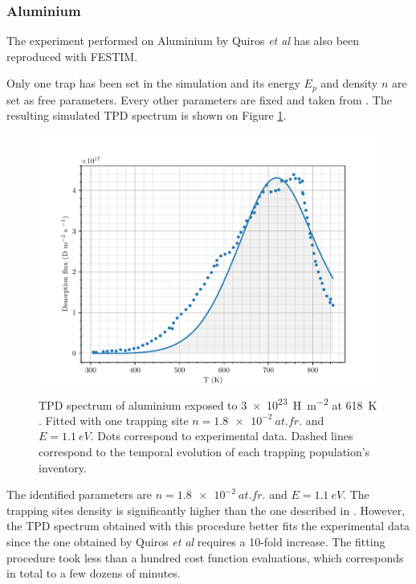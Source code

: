 \subsubsection{Aluminium}

The experiment performed on Aluminium by Quiros \textit{et al}  has also been reproduced with FESTIM.

Only one trap has been set in the simulation and its energy $E_p$ and density $n$ are set as free parameters.
Every other parameters are fixed and taken from \cite{quiros_blister_2017, quiros_blistering_2019}.
The resulting simulated TPD spectrum is shown on Figure \ref{fig:TPD alu}.
\begin{figure} [ht]
    \centering
    \includegraphics[width=\linewidth]{Figures/Chapter3/Parametric_optimisation/alu_quiros.pdf}
    \caption{TPD spectrum of aluminium exposed to \SI{3e23}{H.m^{-2}} at \SI{618}{K} \cite{quiros_blister_2017, quiros_blistering_2019}. Fitted with one trapping site $n = \SI{1.8e-2}{at.fr.}$ and $E =\SI{1.1}{eV}$. Dots correspond to experimental data. Dashed lines correspond to the temporal evolution of each trapping population's inventory.}
    \label{fig:TPD alu}
\end{figure}


The identified parameters are $n = \SI{1.8e-2}{at.fr.}$ and $E =\SI{1.1}{eV}$.
The trapping sites density is significantly higher than the one described in \cite{quiros_blister_2017}.
However, the TPD spectrum obtained with this procedure better fits the experimental data since the one obtained by Quiros \textit{et al} requires a 10-fold increase.
The fitting procedure took less than a hundred cost function evaluations, which corresponds in total to a few dozens of minutes.

